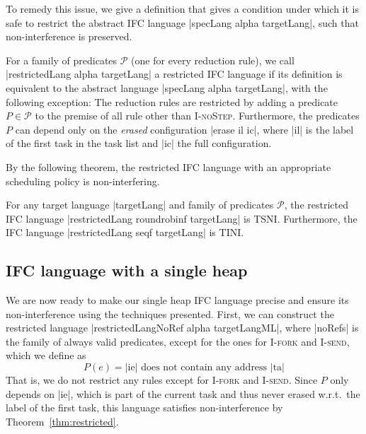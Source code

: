 To remedy this issue, we give a definition that gives a condition
under which it is safe to restrict the abstract IFC language
|specLang alpha targetLang|, such that non-interference is preserved.

\begin{definition}
  \label{def:restricted}
  For a family of predicates $\mathcal P$ (one for every reduction
  rule), we call
  |restrictedLang alpha targetLang| a restricted IFC language
  if its definition is equivalent to the abstract language
  |specLang alpha targetLang|, with the following exception:
  The reduction rules are restricted
  by adding a predicate $P \in \mathcal P$ to the premise of
  all rule other than \textsc{I-noStep}.  Furthermore, the predicates $P$
  can depend only on the \textit{erased} configuration
  |erase il ic|, where |il| is the label of the first task
  in the task list and |ic| the full configuration.
\end{definition}

By the following theorem, the restricted IFC language with an
appropriate scheduling policy is non-interfering.

\begin{theorem}
  \label{thm:restricted}
  For any target language |targetLang| and family of predicates
  $\mathcal{P}$, the restricted IFC language |restrictedLang roundrobinf targetLang|
  is TSNI.  Furthermore, the IFC language
  |restrictedLang seqf targetLang| is TINI.
\end{theorem}


\subsection{IFC language with a single heap}

We are now ready to make our single heap IFC language precise and
ensure its non-interference using the techniques presented.
First, we can construct the restricted language
|restrictedLangNoRef alpha targetLangML|, where |noRefs| is
the family of always valid predicates, except for the ones for
\textsc{I-fork} and \textsc{I-send}, which we define as
\[ P(e) = \text{|ie| does not contain any address |ta|} \]
That is, we do not restrict any rules except for \textsc{I-fork}
and \textsc{I-send}.
Since $P$ only depends on |ie|, which is part of the current
task and thus never erased w.r.t.\ the label of the first task,
this language satisfies non-interference by Theorem~\ref{thm:restricted}.


